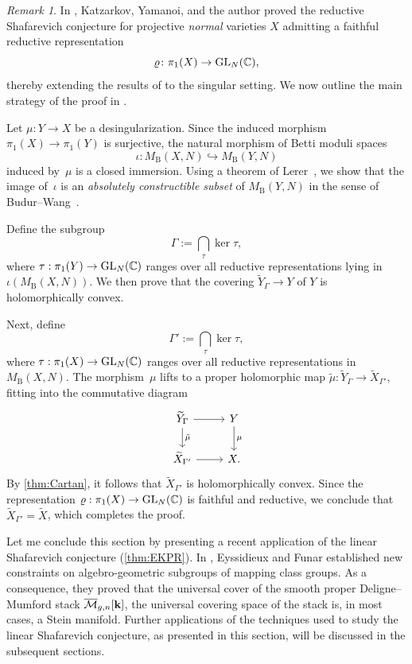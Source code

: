 \documentclass[english]{amsproc}
\theoremstyle{plain}
\theoremstyle{definition}
\theoremstyle{remark}
\newtheorem{rem}[thm]{Remark}
\theoremstyle{plain}
\numberwithin{equation}{thm} %
\newcommand{\GL}{{\rm GL}}
\begin{document}
	\begin{rem}
	In \cite[Appendix]{DY23}, Katzarkov, Yamanoi, and the   author proved the reductive Shafarevich conjecture for projective \emph{normal} varieties $X$ admitting a faithful reductive representation
	\[
	\varrho \colon \pi_1(X) \to \GL_N(\mathbb{C}),
	\]
	thereby extending the results of \cite{Eys04} to the singular setting.
	We now outline the main strategy of the proof in \cite{DY23}.
	
		
		
		Let \(\mu:Y\to X\) be a desingularization. 
		Since the induced morphism \(\pi_1(X)\to \pi_1(Y)\) is surjective, 
		the natural morphism of Betti moduli spaces
		\[
		\iota:M_{\mathrm{B}}(X,N)\hookrightarrow M_{\mathrm{B}}(Y,N)
		\]
		induced by~\(\mu\) is a closed immersion.
		Using a theorem of Lerer~\cite{Ler22}, we show that the image of~\(\iota\) is an 
		\emph{absolutely constructible subset} of \(M_{\mathrm{B}}(Y,N)\) in the sense of 
		Budur--Wang~\cite{BW20}.
		
		Define the subgroup
		\[
		\Gamma:=\bigcap_{\tau}\ker\tau,
		\]
		where \(\tau:\pi_1(Y)\to \GL_{N}(\mathbb{C})\) ranges over all reductive representations 
		lying in \(\iota(M_{\mathrm{B}}(X,N))\).
		We then prove that the covering \(\widetilde{Y}_{\Gamma}\to Y\)  of $Y$ is holomorphically convex.
		
		Next, define
		\[
		\Gamma':=\bigcap_{\tau}\ker\tau,
		\]
		where \(\tau:\pi_1(X)\to \GL_{N}(\mathbb{C})\) ranges over all reductive representations in 
		\(M_{\mathrm{B}}(X,N)\).
		The morphism~\(\mu\) lifts to a proper holomorphic map
		\(\tilde{\mu}:\widetilde{Y}_{\Gamma}\to \widetilde{X}_{\Gamma'}\), fitting into the 
		commutative diagram
		\[
		\begin{tikzcd}
			\widetilde{Y}_{\Gamma}\arrow[r]\arrow[d,"\tilde{\mu}"] & Y\arrow[d,"\mu"]\\
			\widetilde{X}_{\Gamma'}\arrow[r] & X .
		\end{tikzcd}
		\]
		By \cref{thm:Cartan}, it follows that \(\widetilde{X}_{\Gamma'}\) is holomorphically convex.
		Since the representation \(\varrho:\pi_1(X)\to \GL_{N}(\mathbb{C})\) is faithful and reductive, 
		we conclude that \(\widetilde{X}_{\Gamma'}=\widetilde{X}\), which completes the proof.
	\end{rem}
Let me conclude this section by presenting a recent application of the linear Shafarevich conjecture (\cref{thm:EKPR}). In \cite{EF25}, Eyssidieux and Funar established new constraints on algebro-geometric subgroups of mapping class groups. As a consequence, they proved that the universal cover of the smooth proper Deligne–Mumford stack  $\overline{\mathcal{M}}_{g,n}[{\bf{k}}]$, the universal covering space of the stack is, in most cases, a Stein manifold. Further applications of the techniques used to study the linear Shafarevich conjecture, as presented in this section, will be discussed in the subsequent sections.
	
\end{document}
